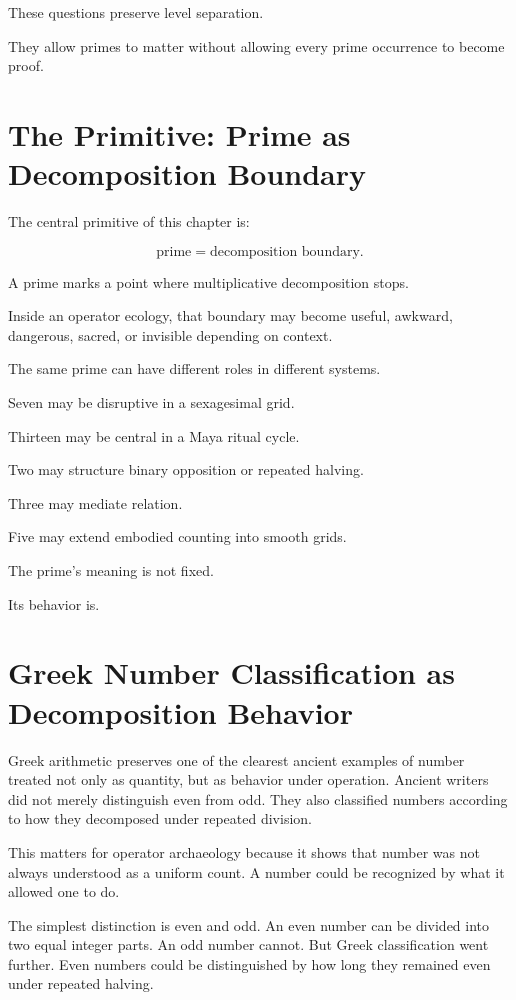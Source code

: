 \documentclass[11pt]{book}
\begin{document}
These questions preserve level separation.

They allow primes to matter without allowing every prime occurrence to become proof.

\section{The Primitive: Prime as Decomposition Boundary}

The central primitive of this chapter is:

\[
\text{prime} = \text{decomposition boundary}.
\]

A prime marks a point where multiplicative decomposition stops.

Inside an operator ecology, that boundary may become useful, awkward, dangerous, sacred, or invisible depending on context.

The same prime can have different roles in different systems.

Seven may be disruptive in a sexagesimal grid.

Thirteen may be central in a Maya ritual cycle.

Two may structure binary opposition or repeated halving.

Three may mediate relation.

Five may extend embodied counting into smooth grids.

The prime's meaning is not fixed.

Its behavior is.

\section{Greek Number Classification as Decomposition Behavior}

Greek arithmetic preserves one of the clearest ancient examples of number treated not only as quantity, but as behavior under operation. Ancient writers did not merely distinguish even from odd. They also classified numbers according to how they decomposed under repeated division.

This matters for operator archaeology because it shows that number was not always understood as a uniform count. A number could be recognized by what it allowed one to do.

The simplest distinction is even and odd. An even number can be divided into two equal integer parts. An odd number cannot. But Greek classification went further. Even numbers could be distinguished by how long they remained even under repeated halving.
\end{document}
